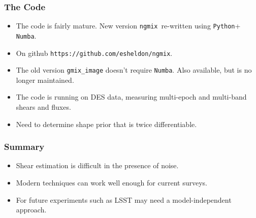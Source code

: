 \documentclass{beamer}
\newcommand{\numba}{\texttt{Numba}}
\newcommand{\python}{\texttt{Python}}
\newcommand{\ngmix}{\texttt{ngmix}}
\begin{document}
\frame
{
    \frametitle{The Code}

    \begin{itemize}

        \item The code is fairly mature.  New version \ngmix\ re-written using
            {\texttt \python + \numba}.

        \item On github  \texttt{https://github.com/esheldon/ngmix}. 
            
        \item The old version \texttt{gmix\_image} doesn't require \numba.
            Also available, but is no longer maintained.

        \item The code is running on DES data, measuring multi-epoch and
            multi-band shears and fluxes.  
            
        \item Need to determine shape prior that is twice differentiable.

    \end{itemize}
}
\frame
{
    \frametitle{Summary}

    \begin{itemize}

        \item Shear estimation is difficult in the presence of noise.

        \item Modern techniques can work well enough for current surveys.

        \item For future experiments such as LSST may need a model-independent
            approach.

    \end{itemize}
}
\end{document}
